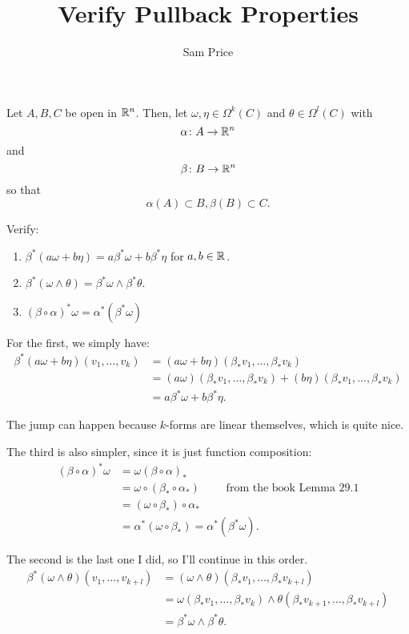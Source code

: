 \documentclass{article}
\author{Sam Price}
\title{Verify Pullback Properties}
\begin{document}
\maketitle

Let $A, B, C$ be open in $\RR[n]$.
Then, let $\omega, \eta \in \Omega^{k}(C)$ and $\theta \in \Omega^{l}(C)$ with
\[ \alpha \from A \to \RR[n] \]
and
\[ \beta \from B \to \RR[n] \]
so that
\[ \alpha(A) \subset B, \beta(B) \subset C. \]

Verify:
\begin{enumerate}[start=1,label={\arabic*\rparen}]
  \item $\beta^{*}(a\omega + b\eta) = a\beta^{*}\omega + b\beta^{*}\eta$ for $a, b \in \RR$.
  \item $\beta^{*}(\omega \wedge \theta) = \beta^{*}\omega \wedge \beta^{*}\theta$.
  \item $(\beta \circ \alpha)^{*}\omega = \alpha^{*}(\beta^{*}\omega)$
\end{enumerate}

For the first, we simply have:
\begin{align*}
  \beta^{*}(a\omega + b\eta)(v_{1}, \ldots, v_{k}) &= (a\omega + b\eta)(\beta_{*}v_{1}, \ldots, \beta_{*}v_{k})\\
  &= (a\omega)(\beta_{*}v_{1}, \ldots, \beta_{*}v_{k}) + (b\eta)(\beta_{*}v_{1}, \ldots, \beta_{*}v_{k})\\
  &= a\beta^{*}\omega + b\beta^{*}\eta.
\end{align*}

The jump can happen because $k$-forms are linear themselves, which is quite nice.

The third is also simpler, since it is just function composition:
\begin{align*}
  (\beta \circ \alpha)^{*}\omega &= \omega(\beta \circ \alpha)_{*}\\
  &= \omega \circ (\beta_{*} \circ \alpha_{*}) \qquad \text{ from the book Lemma 29.1}\\
  &= (\omega \circ \beta_{*}) \circ \alpha_{*}\\
  &= \alpha^{*}(\omega \circ \beta_{*}) = \alpha^{*}(\beta^{*}\omega).
\end{align*}

The second is the last one I did, so I'll continue in this order.
\begin{align*}
  \beta^{*}(\omega \wedge \theta)(v_{1}, \ldots, v_{k + l}) &= (\omega \wedge \theta)(\beta_{*}v_{1}, \ldots, \beta_{*}v_{k + l})\\
  &= \omega(\beta_{*}v_{1}, \ldots, \beta_{*}v_{k}) \wedge \theta(\beta_{*}v_{k + 1}, \ldots, \beta_{*}v_{k + l})\\
  &= \beta^{*}\omega \wedge \beta^{*}\theta.
\end{align*}
\end{document}
